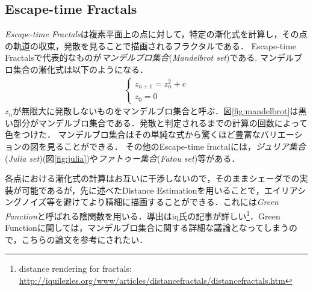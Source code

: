 \subsection{Escape-time Fractals}
{\it Escape-time Fractals}は複素平面上の点に対して，特定の漸化式を計算し，その点の軌道の収束，発散を見ることで描画されるフラクタルである．
Escape-time Fractalsで代表的なものが\emph{マンデルブロ集合}({\it Mandelbrot set})である. 
マンデルブロ集合の漸化式は以下のようになる．
\begin{eqnarray*}
 \begin{cases}
  z_{n+1} = z^2_{n} + c \\ z_0 = 0
 \end{cases}
\end{eqnarray*}
$z_n$が無限大に発散しないものをマンデルブロ集合と呼ぶ．図\ref{fig:mandelbrot}は黒い部分がマンデルブロ集合である．発散と判定されるまでの計算の回数によって色をつけた．
マンデルブロ集合はその単純な式から驚くほど豊富なバリエーションの図を見ることができる．
その他のEscape-time fractalには，\emph{ジュリア集合}({\it Julia set})(図\ref{fig:julia})や\emph{ファトゥー集合}({\it Fatou set})等がある．

各点における漸化式の計算はお互いに干渉しないので，そのままシェーダでの実装が可能であるが，先に述べたDistance Estimationを用いることで，エイリアシングノイズ等を避けてより精細に描画することができる．これには{\it Green Function}と呼ばれる陰関数を用いる．導出はiq氏の記事が詳しい\footnote{distance rendering for fractals: \url{http://iquilezles.org/www/articles/distancefractals/distancefractals.htm}}．Green Functionに関しては，マンデルブロ集合に関する詳細な議論となってしまうので，こちらの論文\cite{mandelbrot}を参考にされたい．

